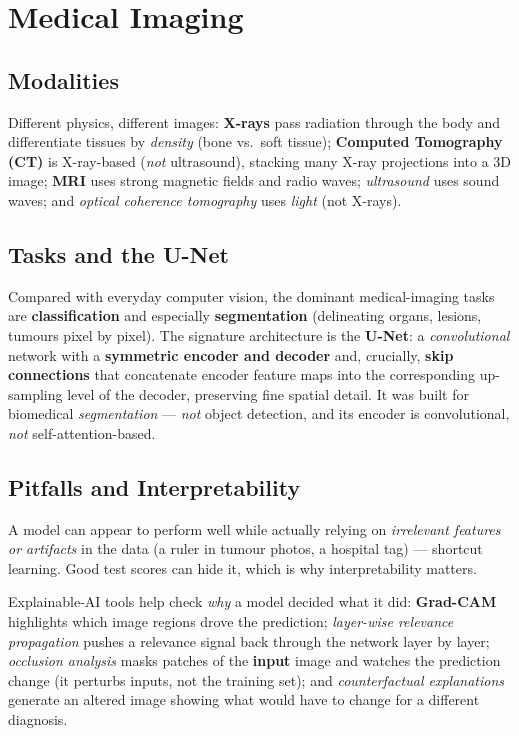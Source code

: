 \documentclass[11pt, oneside]{book}
\begin{document}
\section{Medical Imaging}

\subsection{Modalities}

Different physics, different images: \textbf{X-rays} pass radiation through the body
and differentiate tissues by \emph{density} (bone vs.\ soft tissue);
\textbf{Computed Tomography (CT)} is X-ray-based (\emph{not} ultrasound), stacking
many X-ray projections into a 3D image; \textbf{MRI} uses strong magnetic fields and
radio waves; \emph{ultrasound} uses sound waves; and \emph{optical coherence
tomography} uses \emph{light} (not X-rays).

\subsection{Tasks and the U-Net}

Compared with everyday computer vision, the dominant medical-imaging tasks are
\textbf{classification} and especially \textbf{segmentation} (delineating organs,
lesions, tumours pixel by pixel). The signature architecture is the
\textbf{U-Net}: a \emph{convolutional} network with a \textbf{symmetric encoder and
decoder} and, crucially, \textbf{skip connections} that concatenate encoder feature
maps into the corresponding up-sampling level of the decoder, preserving fine
spatial detail. It was built for biomedical \emph{segmentation} --- \emph{not} object
detection, and its encoder is convolutional, \emph{not} self-attention-based.

\subsection{Pitfalls and Interpretability}

\begin{notebox}[title={The ``Clever Hans'' effect}]
A model can appear to perform well while actually relying on \emph{irrelevant
features or artifacts} in the data (a ruler in tumour photos, a hospital tag) ---
shortcut learning. Good test scores can hide it, which is why interpretability
matters.
\end{notebox}

Explainable-AI tools help check \emph{why} a model decided what it did:
\textbf{Grad-CAM} highlights which image regions drove the prediction;
\emph{layer-wise relevance propagation} pushes a relevance signal back through the
network layer by layer; \emph{occlusion analysis} masks patches of the \textbf{input}
image and watches the prediction change (it perturbs inputs, not the training set);
and \emph{counterfactual explanations} generate an altered image showing what would
have to change for a different diagnosis.
\end{document}
